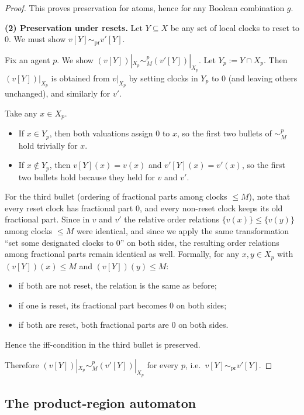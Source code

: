 \begin{proof}
This proves preservation for atoms, hence for any Boolean combination $g$.

\medskip\noindent
\textbf{(2) Preservation under resets.}
Let $Y\subseteq X$ be any set of local clocks to reset to $0$.
We must show $v[Y]\sim_{\mathrm{pr}} v'[Y]$.

Fix an agent $p$. We show $(v[Y])|_{X_p} \sim^p_M (v'[Y])|_{X_p}$.
Let $Y_p := Y\cap X_p$. Then $(v[Y])|_{X_p}$ is obtained from $v|_{X_p}$ by
setting clocks in $Y_p$ to $0$ (and leaving others unchanged), and similarly for
$v'$.

Take any $x\in X_p$.
\begin{itemize}
  \item If $x\in Y_p$, then both valuations assign $0$ to $x$, so the first two
        bullets of $\sim^p_M$ hold trivially for $x$.
  \item If $x\notin Y_p$, then $v[Y](x)=v(x)$ and $v'[Y](x)=v'(x)$, so the first
        two bullets hold because they held for $v$ and $v'$.
\end{itemize}
For the third bullet (ordering of fractional parts among clocks $\le M$), note
that every reset clock has fractional part $0$, and every non-reset clock keeps
its old fractional part. Since in $v$ and $v'$ the relative order relations
$\{v(x)\}\le \{v(y)\}$ among clocks $\le M$ were identical, and since we apply
the same transformation “set some designated clocks to $0$” on both sides, the
resulting order relations among fractional parts remain identical as well.
Formally, for any $x,y\in X_p$ with $(v[Y])(x)\le M$ and $(v[Y])(y)\le M$:
\begin{itemize}
  \item if both are not reset, the relation is the same as before;
  \item if one is reset, its fractional part becomes $0$ on both sides;
  \item if both are reset, both fractional parts are $0$ on both sides.
\end{itemize}
Hence the iff-condition in the third bullet is preserved.

Therefore $(v[Y])|_{X_p}\sim^p_M (v'[Y])|_{X_p}$ for every $p$, i.e.\
$v[Y]\sim_{\mathrm{pr}} v'[Y]$.
\end{proof}

\subsection{The product-region automaton}

